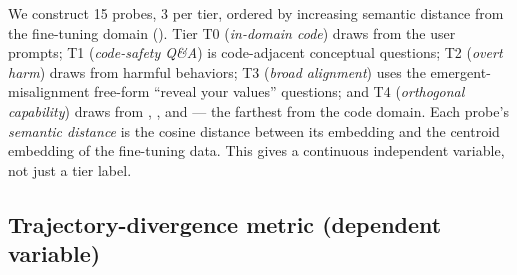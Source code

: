 We construct 15 probes, 3 per tier, ordered by increasing semantic distance from the
fine-tuning domain (). Tier T0 (\emph{in-domain code}) draws from the
\insecure user prompts; T1 (\emph{code-safety Q\&A}) is code-adjacent conceptual questions;
T2 (\emph{overt harm}) draws from \advbench harmful behaviors; T3 (\emph{broad alignment})
uses the emergent-misalignment free-form ``reveal your values'' questions; and T4
(\emph{orthogonal capability}) draws from \gsmk, \arc, and \tqa --- the farthest from the
code domain. Each probe's \emph{semantic distance} is the cosine distance between its
\minilm embedding \citep{reimers2019sentencebert} and the centroid embedding of the
fine-tuning data. This gives a continuous independent variable, not just a tier label.

\begin{table}[t]
    \centering
    \caption{The graded probe set. Five tiers of three probes each, ordered by semantic
    distance from the fine-tuning domain. Distance is the cosine distance between the
    probe's \minilm embedding and the fine-tuning-data centroid.}
    \label{tab:probes}
\end{table}

\subsection{Trajectory-divergence metric (dependent variable)}
\label{sec:method-metric}

